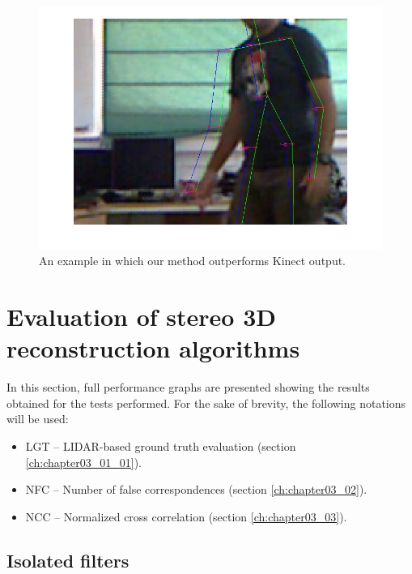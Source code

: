 \begin{figure}[h]
  \centering
  \includegraphics[width=0.5\columnwidth, trim=0 0 0 0,clip]{fig34.jpg}
  \caption{An example in which our method outperforms Kinect output.}
  \label{fig:cp02_comparison_kinect_fails}
\end{figure}


\graphicspath{{./images/chapter03/bmps/}{./images/chapter03/vects/}{./images/chapter03/}}
\section{Evaluation of stereo 3D reconstruction algorithms}\label{ch:chapter03_04}

In this section, full performance graphs are presented showing the results obtained for the tests performed. For the sake of brevity, the following notations will be used:
\begin{itemize}
 \item LGT – LIDAR-based ground truth evaluation (section \ref{ch:chapter03_01_01}).
 \item NFC – Number of false correspondences (section \ref{ch:chapter03_02}).
 \item NCC – Normalized cross correlation (section \ref{ch:chapter03_03}).
\end{itemize}

\subsection{Isolated filters}\label{ch:chapter03_04_01}


